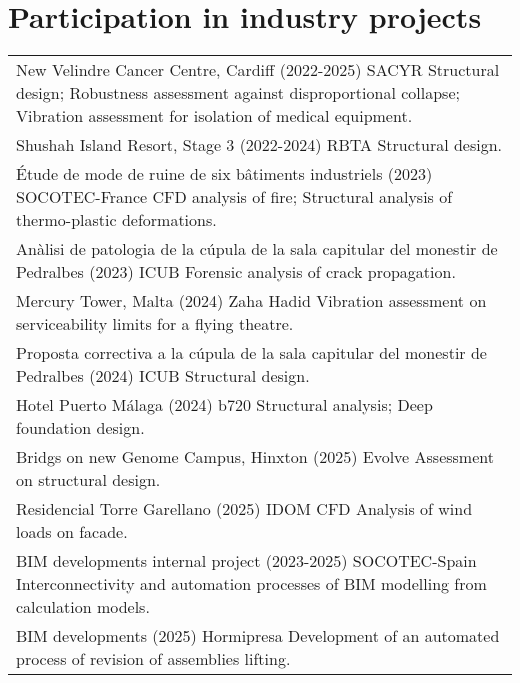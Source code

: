 \documentclass[12pt]{article}
\begin{document}
\section{Participation in industry projects}
\begin{tabularx}{\linewidth}{X}
    New Velindre Cancer Centre, Cardiff (2022-2025) SACYR \newline
    Structural design;
    Robustness assessment against disproportional collapse;
    Vibration assessment for isolation of medical equipment. \\
    
    Shushah Island Resort, Stage 3 (2022-2024) RBTA \newline
    Structural design. \\

    Étude de mode de ruine de six bâtiments industriels (2023) SOCOTEC-France \newline
    CFD analysis of fire;
    Structural analysis of thermo-plastic deformations. \\

    Anàlisi de patologia de la cúpula de la sala capitular del monestir de Pedralbes (2023) ICUB \newline
    Forensic analysis of crack propagation. \\

    Mercury Tower, Malta (2024) Zaha Hadid \newline
    Vibration assessment on serviceability limits for a flying theatre. \\

    Proposta correctiva a la cúpula de la sala capitular del monestir de Pedralbes (2024) ICUB \newline
    Structural design. \\

    Hotel Puerto Málaga (2024) b720 \newline
    Structural analysis;
    Deep foundation design. \\

    Bridgs on new Genome Campus, Hinxton (2025) Evolve \newline
    Assessment on structural design. \\

    Residencial Torre Garellano (2025) IDOM \newline
    CFD Analysis of wind loads on facade. \\

    BIM developments internal project (2023-2025) SOCOTEC-Spain \newline
    Interconnectivity and automation processes of BIM modelling from calculation models. \\

    BIM developments (2025) Hormipresa \newline
    Development of an automated process of revision of assemblies lifting.
\end{tabularx}
\end{document}
